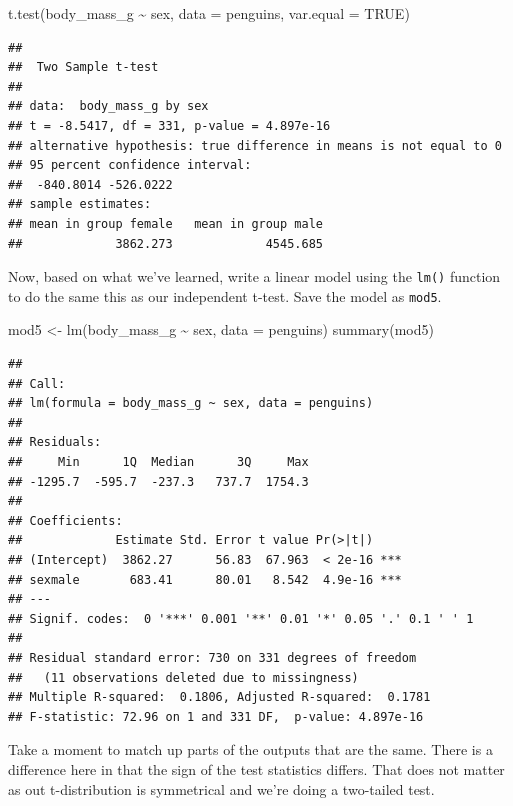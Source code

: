 \documentclass[
  openany]{book}
\newenvironment{Shaded}{\begin{snugshade}}{\end{snugshade}}
\newcommand{\AttributeTok}[1]{\textcolor[rgb]{0.77,0.63,0.00}{#1}}
\newcommand{\ConstantTok}[1]{\textcolor[rgb]{0.00,0.00,0.00}{#1}}
\newcommand{\FunctionTok}[1]{\textcolor[rgb]{0.00,0.00,0.00}{#1}}
\newcommand{\NormalTok}[1]{#1}
\newcommand{\OtherTok}[1]{\textcolor[rgb]{0.56,0.35,0.01}{#1}}
\newcommand{\SpecialCharTok}[1]{\textcolor[rgb]{0.00,0.00,0.00}{#1}}
\begin{document}
\begin{Shaded}
\begin{Highlighting}[]
\FunctionTok{t.test}\NormalTok{(body\_mass\_g }\SpecialCharTok{\textasciitilde{}}\NormalTok{ sex, }\AttributeTok{data =}\NormalTok{ penguins, }\AttributeTok{var.equal =} \ConstantTok{TRUE}\NormalTok{)}
\end{Highlighting}
\end{Shaded}

\begin{verbatim}
## 
##  Two Sample t-test
## 
## data:  body_mass_g by sex
## t = -8.5417, df = 331, p-value = 4.897e-16
## alternative hypothesis: true difference in means is not equal to 0
## 95 percent confidence interval:
##  -840.8014 -526.0222
## sample estimates:
## mean in group female   mean in group male 
##             3862.273             4545.685
\end{verbatim}

Now, based on what we've learned, write a linear model using the \texttt{lm()} function to do the same this as our independent t-test. Save the model as \texttt{mod5}.

\begin{Shaded}
\begin{Highlighting}[]
\NormalTok{mod5 }\OtherTok{\textless{}{-}} \FunctionTok{lm}\NormalTok{(body\_mass\_g }\SpecialCharTok{\textasciitilde{}}\NormalTok{ sex, }\AttributeTok{data =}\NormalTok{ penguins)}
\FunctionTok{summary}\NormalTok{(mod5)}
\end{Highlighting}
\end{Shaded}

\begin{verbatim}
## 
## Call:
## lm(formula = body_mass_g ~ sex, data = penguins)
## 
## Residuals:
##     Min      1Q  Median      3Q     Max 
## -1295.7  -595.7  -237.3   737.7  1754.3 
## 
## Coefficients:
##             Estimate Std. Error t value Pr(>|t|)    
## (Intercept)  3862.27      56.83  67.963  < 2e-16 ***
## sexmale       683.41      80.01   8.542  4.9e-16 ***
## ---
## Signif. codes:  0 '***' 0.001 '**' 0.01 '*' 0.05 '.' 0.1 ' ' 1
## 
## Residual standard error: 730 on 331 degrees of freedom
##   (11 observations deleted due to missingness)
## Multiple R-squared:  0.1806, Adjusted R-squared:  0.1781 
## F-statistic: 72.96 on 1 and 331 DF,  p-value: 4.897e-16
\end{verbatim}

Take a moment to match up parts of the outputs that are the same. There is a difference here in that the sign of the test statistics differs. That does not matter as out t-distribution is symmetrical and we're doing a two-tailed test.
\end{document}
